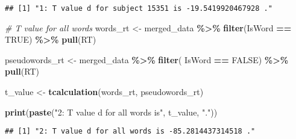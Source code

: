 \documentclass[
]{article}
\newenvironment{Shaded}{\begin{snugshade}}{\end{snugshade}}
\newcommand{\CommentTok}[1]{\textcolor[rgb]{0.56,0.35,0.01}{\textit{#1}}}
\newcommand{\ConstantTok}[1]{\textcolor[rgb]{0.56,0.35,0.01}{#1}}
\newcommand{\FunctionTok}[1]{\textcolor[rgb]{0.13,0.29,0.53}{\textbf{#1}}}
\newcommand{\NormalTok}[1]{#1}
\newcommand{\OtherTok}[1]{\textcolor[rgb]{0.56,0.35,0.01}{#1}}
\newcommand{\SpecialCharTok}[1]{\textcolor[rgb]{0.81,0.36,0.00}{\textbf{#1}}}
\newcommand{\StringTok}[1]{\textcolor[rgb]{0.31,0.60,0.02}{#1}}
\begin{document}
\begin{verbatim}
## [1] "1: T value d for subject 15351 is -19.5419920467928 ."
\end{verbatim}

\begin{Shaded}
\begin{Highlighting}[]
\CommentTok{\# T value for all words}
\NormalTok{words\_rt }\OtherTok{\textless{}{-}}\NormalTok{ merged\_data }\SpecialCharTok{\%\textgreater{}\%}
  \FunctionTok{filter}\NormalTok{(IsWord }\SpecialCharTok{==} \ConstantTok{TRUE}\NormalTok{) }\SpecialCharTok{\%\textgreater{}\%}
  \FunctionTok{pull}\NormalTok{(RT)}

\NormalTok{pseudowords\_rt }\OtherTok{\textless{}{-}}\NormalTok{ merged\_data }\SpecialCharTok{\%\textgreater{}\%}
  \FunctionTok{filter}\NormalTok{( IsWord }\SpecialCharTok{==} \ConstantTok{FALSE}\NormalTok{) }\SpecialCharTok{\%\textgreater{}\%}
  \FunctionTok{pull}\NormalTok{(RT)}

\NormalTok{t\_value }\OtherTok{\textless{}{-}} \FunctionTok{tcalculation}\NormalTok{(words\_rt, pseudowords\_rt)}

\FunctionTok{print}\NormalTok{(}\FunctionTok{paste}\NormalTok{(}\StringTok{"2: T value d for all words is"}\NormalTok{, t\_value, }\StringTok{"."}\NormalTok{))}
\end{Highlighting}
\end{Shaded}

\begin{verbatim}
## [1] "2: T value d for all words is -85.2814437314518 ."
\end{verbatim}
\end{document}
